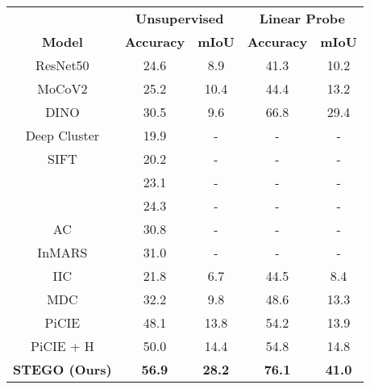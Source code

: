 \documentclass{article} \usepackage{iclr2022_conference,times}
\begin{document}
\begin{table}[t]
\centering
{}
 \vspace{-.2in}
\begin{tabular}{c|cc|cc}
\textbf{}                           & \multicolumn{2}{c|}{\textbf{Unsupervised}} & \multicolumn{2}{c}{\textbf{Linear Probe}} \\
\textbf{Model}                      & \textbf{Accuracy}      & \textbf{mIoU}     & \textbf{Accuracy}     & \textbf{mIoU}     \\ \hline
ResNet50 \citep{he2016deep}               & 24.6                   & 8.9               & 41.3                  & 10.2              \\
MoCoV2 \citep{mocov2}                 & 25.2                   & 10.4              & 44.4                  & 13.2              \\
DINO \citep{dino}                   & 30.5                   & 9.6               & 66.8                  & 29.4              \\
Deep Cluster   \citep{deep-cluster} & 19.9                   & -                 & -                     & -                 \\
SIFT \citep{SIFT}                   & 20.2                   & -                 & -                     & -                 \\
\cite{doersh15}                    & 23.1                   & -                 & -                     & -                 \\
\cite{isola16}                     & 24.3                   & -                 & -                     & -                 \\
AC \citep{ac}                       & 30.8                   & -                 & -                     & -                 \\
InMARS \citep{inmars}               & 31.0                   & -                 & -                     & -                 \\
IIC \citep{iic}                     & 21.8                   & 6.7               & 44.5                  & 8.4               \\
MDC \citep{Cho2021PiCIEUS}          & 32.2                   & 9.8               & 48.6                  & 13.3              \\
PiCIE \citep{Cho2021PiCIEUS}        & 48.1                   & 13.8              & 54.2                  & 13.9              \\
PiCIE + H   \citep{Cho2021PiCIEUS}  & 50.0                   & 14.4              & 54.8                  & 14.8              \\
\textbf{STEGO (Ours)}               & \textbf{56.9}          & \textbf{28.2}     & \textbf{76.1}         & \textbf{41.0}    
\end{tabular}
  \label{table:cocostuff_results}
\end{table} 
\end{document}
